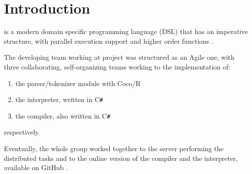 \chapter{Introduction}

\fwap is a modern domain specific programming language (DSL) that has an imperative structure, with parallel execution support and higher order functions \cite{exercise}. 

The developing team working at project was structured as an Agile one, with three collaborating, self-organizing teams working to the implementation of:
\begin{enumerate}
	\item the parser/tokenizer module with Coco/R
	\item the interpreter, written in C\texttt{#}
	\item the \fsharp compiler, also written in C\texttt{#}
\end{enumerate}
respectively. 

Eventually, the whole group worked together to the server performing the distributed tasks and to the online version of the compiler and the interpreter, available on GitHub \cite{proj}.
